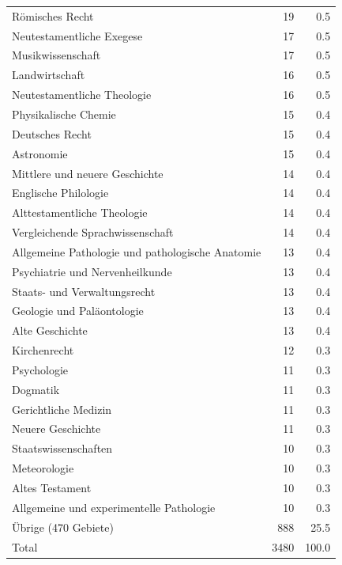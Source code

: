 \begin{tabular}{lrr}
Römisches Recht & 19 & 0.5 \\
Neutestamentliche Exegese & 17 & 0.5 \\
Musikwissenschaft & 17 & 0.5 \\
Landwirtschaft & 16 & 0.5 \\
Neutestamentliche Theologie & 16 & 0.5 \\
Physikalische Chemie & 15 & 0.4 \\
Deutsches Recht & 15 & 0.4 \\
Astronomie & 15 & 0.4 \\
Mittlere und neuere Geschichte & 14 & 0.4 \\
Englische Philologie & 14 & 0.4 \\
Alttestamentliche Theologie & 14 & 0.4 \\
Vergleichende Sprachwissenschaft & 14 & 0.4 \\
Allgemeine Pathologie und pathologische Anatomie & 13 & 0.4 \\
Psychiatrie und Nervenheilkunde & 13 & 0.4 \\
Staats- und Verwaltungsrecht & 13 & 0.4 \\
Geologie und Paläontologie & 13 & 0.4 \\
Alte Geschichte & 13 & 0.4 \\
Kirchenrecht & 12 & 0.3 \\
Psychologie & 11 & 0.3 \\
Dogmatik & 11 & 0.3 \\
Gerichtliche Medizin & 11 & 0.3 \\
Neuere Geschichte & 11 & 0.3 \\
Staatswissenschaften & 10 & 0.3 \\
Meteorologie & 10 & 0.3 \\
Altes Testament & 10 & 0.3 \\
Allgemeine und experimentelle Pathologie & 10 & 0.3 \\
Übrige (470 Gebiete) & 888 & 25.5 \\
Total & 3480 & 100.0 \\
\bottomrule
\end{tabular}
